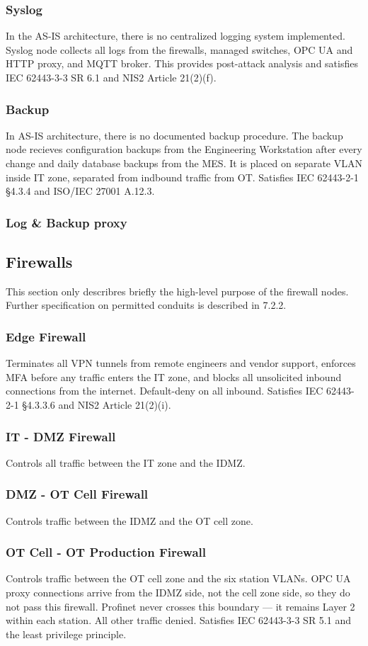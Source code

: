 \subsubsection{Syslog}
In the AS-IS architecture, there is no centralized logging system implemented.
Syslog node collects all logs from the firewalls, managed switches, OPC UA and HTTP proxy, and MQTT broker.
This provides post-attack analysis and satisfies IEC 62443-3-3 SR 6.1 and NIS2 Article 21(2)(f). 
\subsubsection{Backup}
In AS-IS architecture, there is no documented backup procedure. The backup node recieves
configuration backups from the Engineering Workstation after every change and daily database
backups from the MES. It is placed on separate VLAN inside IT zone, separated from
indbound traffic from OT. Satisfies IEC 62443-2-1 §4.3.4 and ISO/IEC 27001 A.12.3.
\subsubsection{Log \& Backup proxy}



\subsection{Firewalls}
This section only describres briefly the high-level purpose of the firewall nodes.
Further specification on permitted conduits is described in 7.2.2.
\subsubsection{Edge Firewall}
Terminates all VPN tunnels from remote engineers and vendor support, 
enforces MFA before any traffic enters the IT zone, and blocks all unsolicited inbound 
connections from the internet. Default-deny on all inbound. 
Satisfies IEC 62443-2-1 §4.3.3.6 and NIS2 Article 21(2)(i).
\subsubsection{IT - DMZ Firewall}
Controls all traffic between the IT zone and the IDMZ. 
\subsubsection{DMZ - OT Cell Firewall}
Controls traffic between the IDMZ and the OT cell zone. 
\subsubsection{OT Cell - OT Production Firewall}
Controls traffic between the OT cell zone and the six station VLANs. 
OPC UA proxy connections arrive from the IDMZ side, not the cell zone side, 
so they do not pass this firewall. Profinet never crosses this boundary — 
it remains Layer 2 within each station. All other traffic denied. 
Satisfies IEC 62443-3-3 SR 5.1 and the least privilege principle.

